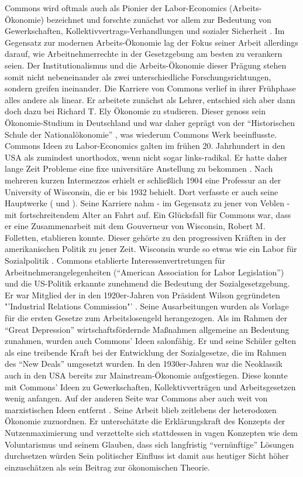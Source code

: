 Commons wird oftmals auch als Pionier der Labor-Economics (Arbeits-Ökonomie) bezeichnet und forschte zunächst vor allem zur Bedeutung von Gewerkschaften, Kollektivvertrags-Verhandlungen und sozialer Sicherheit \parencite[S. 44]{Barbash1989}. Im Gegensatz zur modernen Arbeits-Ökonomie lag der Fokus seiner Arbeit allerdings darauf, wie Arbeitnehmerrechte in der Gesetzgebung am besten zu verankern seien. Der Institutionalismus und die Arbeits-Ökonomie dieser Prägung stehen somit nicht nebeneinander als zwei unterschiedliche Forschungsrichtungen, sondern greifen ineinander. Die Karriere von Commons verlief in ihrer Frühphase alles andere als linear. Er arbeitete zunächst als Lehrer, entschied sich aber dann doch dazu bei Richard T. Ely Ökonomie zu studieren. Dieser genoss sein Ökonomie-Studium in Deutschland und war daher geprägt von der "`Historischen Schule der Nationalökonomie"' \parencite{Watkins}, was wiederum Commons Werk beeinflusste. Commons Ideen zu Labor-Economics galten im frühen 20. Jahrhundert in den USA als zumindest unorthodox, wenn nicht sogar links-radikal. Er hatte daher lange Zeit Probleme eine fixe universitäre Anstellung zu bekommen \parencite{Watkins}. Nach mehreren kurzen Intermezzos erhielt er schließlich 1904 eine Professur an der University of Wisconsin, die er bis 1932 behielt. Dort verfasste er auch seine Hauptwerke (\textcite{Commons1924} und \textcite{Commons1934}). Seine Karriere nahm - im Gegensatz zu jener von Veblen - mit fortschreitendem Alter an Fahrt auf. Ein Glücksfall für Commons war, dass er eine Zusammenarbeit mit dem Gouverneur von Wisconsin, Robert M. Folletten, etablieren konnte. Dieser gehörte zu den progressiven Kräften in der amerikanischen Politik zu jener Zeit. Wisconsin wurde so etwas wie ein Labor für Sozialpolitik \parencite[S. 44]{Barbash1989}. Commons etablierte Interessenvertretungen für Arbeitnehmerangelegenheiten ("`American Association for Labor Legislation"') und die US-Politik erkannte zunehmend die Bedeutung der Sozialgesetzgebung. Er war Mitglied der in den 1920er-Jahren von Präsident Wilson gegründeten "'Industrial Relations Commission"' \parencite[S. 45]{Barbash1989}. Seine Ausarbeitungen wurden als Vorlage für die ersten Gesetze zum Arbeitslosengeld herangezogen. Als im Rahmen der "`Great Depression"' wirtschaftsfördernde Maßnahmen allgemeine an Bedeutung zunahmen, wurden auch Commons' Ideen salonfähig. Er und seine Schüler gelten als eine treibende Kraft bei der Entwicklung der Sozialgesetze, die im Rahmen des "`New Deals"' umgesetzt wurden. In den 1930er-Jahren war die Neoklassik auch in den USA bereits zur Mainstream-Ökonomie aufgestiegen. Diese konnte mit Commons' Ideen zu Gewerkschaften, Kollektivverträgen und Arbeitsgesetzen wenig anfangen. Auf der anderen Seite war Commons aber auch weit von marxistischen Ideen entfernt \parencite[S. 47]{Barbash1989}. Seine Arbeit blieb zeitlebens der heterodoxen Ökonomie zuzuordnen. Er unterschätzte die Erklärungskraft des Konzepts der Nutzenmaximierung und verzettelte sich stattdessen in vagen Konzepten wie dem Voluntarismus und seinem Glauben, dass sich langfristig "`vernünftige"' Lösungen durchsetzen würden \parencite[S. 48]{Barbash1989} Sein politischer Einfluss ist damit aus heutiger Sicht höher einzuschätzen als sein Beitrag zur ökonomischen Theorie. 

